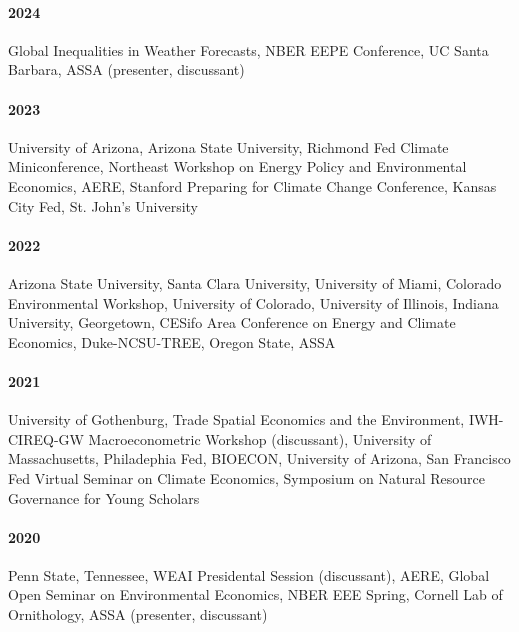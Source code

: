 \documentclass[12pt]{res} %
\begin{document}
\begin{resume}
\paragraph{2024} Global Inequalities in Weather Forecasts, NBER EEPE Conference, UC Santa Barbara, ASSA (presenter, discussant) \vspace{-.2in}
\paragraph{2023} University of Arizona, Arizona State University, Richmond Fed Climate Miniconference, Northeast Workshop on Energy Policy and Environmental Economics, AERE, Stanford Preparing for Climate Change Conference, Kansas City Fed, St. John's University \vspace{-.2in}
\paragraph{2022} Arizona State University, Santa Clara University, University of Miami, Colorado Environmental Workshop, University of Colorado, University of Illinois, Indiana University, Georgetown, CESifo Area Conference on Energy and Climate Economics, Duke-NCSU-TREE, Oregon State, ASSA \vspace{-.2in}
\paragraph{2021} University of Gothenburg, Trade Spatial Economics and the Environment, IWH-CIREQ-GW Macroeconometric Workshop (discussant), University of Massachusetts, Philadephia Fed, BIOECON, University of Arizona, San Francisco Fed Virtual Seminar on Climate Economics, Symposium on Natural Resource Governance for Young Scholars \vspace{-.2in}
\paragraph{2020} Penn State, Tennessee, WEAI Presidental Session (discussant), AERE, Global Open Seminar on Environmental Economics, NBER EEE Spring, Cornell Lab of Ornithology, ASSA (presenter, discussant) \vspace{-.2in}

\end{resume}
\end{document}
